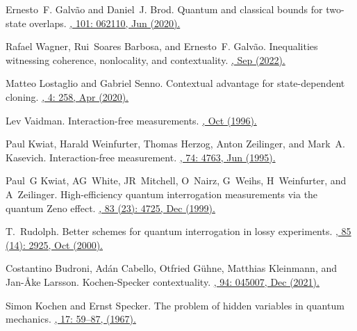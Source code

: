 \documentclass[a4paper,twocolumn,11pt,accepted=2024-01-17]{quantumarticle}
\begin{document}
\begin{thebibliography}{100}
Ernesto~F. Galv\~ao and Daniel~J. Brod.
\newblock Quantum and classical bounds for two-state overlaps.
\href{https://doi.org/10.1103/PhysRevA.101.062110}{, 101: 062110, Jun (2020).}

Rafael Wagner, Rui~Soares Barbosa, and Ernesto~F. Galv\~{a}o.
\newblock Inequalities witnessing coherence, nonlocality, and contextuality.
\href{https://doi.org/10.48550/arXiv.2209.02670}{, Sep (2022).}

Matteo Lostaglio and Gabriel Senno.
\newblock Contextual advantage for state-dependent cloning.
\href{https://doi.org/10.22331/q-2020-04-27-258}{, 4: 258, Apr (2020).}

Lev Vaidman.
\newblock Interaction-free measurements.
\href{https://doi.org/10.48550/arXiv.quant-ph/9610033}{, Oct (1996).}

Paul Kwiat, Harald Weinfurter, Thomas Herzog, Anton Zeilinger, and Mark~A.
  Kasevich.
\newblock Interaction-free measurement.
\href{https://doi.org/10.1103/PhysRevLett.74.4763}{, 74: 4763, Jun (1995).}

Paul~G Kwiat, AG~White, JR~Mitchell, O~Nairz, G~Weihs, H~Weinfurter, and  A~Zeilinger.
\newblock High-efficiency quantum interrogation measurements via the quantum  {Z}eno effect.
\href{https://doi.org/10.1103/PhysRevLett.83.4725}{, 83 (23): 4725, Dec (1999).}

T.~Rudolph.
\newblock Better schemes for quantum interrogation in lossy experiments.
\href{https://doi.org/10.1103/PhysRevLett.85.2925}{, 85 (14): 2925, Oct (2000).}

Costantino Budroni, Ad{\'a}n Cabello, Otfried G{\"u}hne, Matthias Kleinmann,
  and Jan-{\AA}ke Larsson.
\newblock Kochen-{S}pecker contextuality.
\href{https://doi.org/10.1103/RevModPhys.94.045007}{, 94: 045007, Dec (2021).}

Simon Kochen and Ernst Specker.
\newblock The problem of hidden variables in quantum mechanics.
\href{https://doi.org/10.1007/978-3-0348-9259-9_21}{, 17: 59--87, (1967).}


\end{thebibliography}
\end{document}
